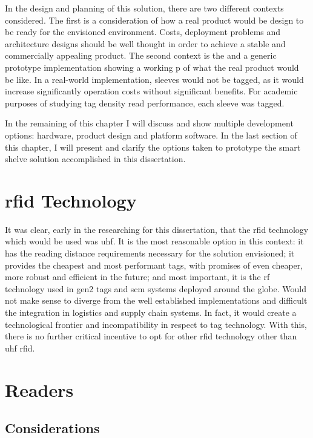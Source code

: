 In the design and planning of this solution, there are two different contexts considered. The first is a consideration of how a real product would be design to be ready for the envisioned environment. Costs, deployment problems and architecture designs should be well thought in order to achieve a stable and commercially appealing product.
The second context is the  and a generic prototype implementation showing a working p of what the real product would be like.
In a real-world implementation, sleeves would not be tagged, as it would increase significantly operation costs without significant benefits. For academic purposes of studying tag density read performance, each sleeve was tagged.

In the remaining of this chapter I will discuss and show multiple development options: hardware, product design and platform software. In the last section of this chapter, I will present and clarify the options taken to prototype the smart shelve solution accomplished in this dissertation.

\section{\acs{rfid} Technology}

It was clear, early in the researching for this dissertation, that the \ac{rfid} technology which would be used was \ac{uhf}. 
It is the most reasonable option in this context: it has the reading distance requirements necessary for the solution envisioned; it provides the cheapest and most performant tags, with promises of even cheaper, more robust and efficient in the future; and most important, it is the \ac{rf} technology used in \ac{gen2} tags and \ac{scm} systems deployed around the globe. 
Would not make sense to diverge from the well established implementations and difficult the integration in logistics and supply chain systems.
In fact, it would create a technological frontier and incompatibility in respect to tag technology.
With this, there is no further critical incentive to opt for other \ac{rfid} technology other than \ac{uhf} \ac{rfid}.

\section{Readers}

\subsection{Considerations}


